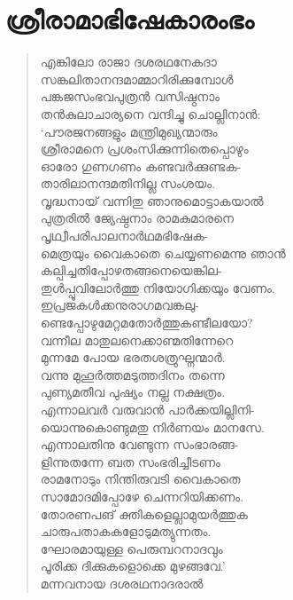 
\section{ശ്രീരാമാഭിഷേകാരംഭം}

\begin{verse}
എങ്കിലോ രാജാ ദശരഥനേകദാ\\
സങ്കലിതാനന്ദമാമ്മാറിരിക്കുമ്പോള്‍\\
പങ്കജസംഭവപുത്രന്‍ വസിഷ്ഠനാം\\
തന്‍കുലാചാര്യനെ വന്ദിച്ചു ചൊല്ലിനാന്‍:\\
‘പൗരജനങ്ങളും മന്ത്രിമുഖ്യന്മാരും\\
ശ്രീരാമനെ പ്രശംസിക്കുന്നിതെപ്പൊഴും\\
ഓരോ ഗുണഗണം കണ്ടവര്‍ക്കുണ്ടക-\\
താരിലാനന്ദമതിനില്ല സംശയം.\\
വൃദ്ധനായ് വന്നിതു ഞാനുമൊട്ടാകയാല്‍\\
പുത്രരില്‍ ജ്യേഷ്ഠനാം രാമകുമാരനെ\\
പൃഥ്വീപരിപാലനാര്‍ഥമഭിഷേക-\\
മെത്രയും വൈകാതെ ചെയ്യണമെന്നു ഞാന്‍\\
കല്പിച്ചതിപ്പോഴതങ്ങനെയെങ്കില-\\
തുള്‍പ്പൂവിലോര്‍ത്തു നിയോഗിക്കയും വേണം.\\
ഇപ്രജകള്‍ക്കനുരാഗമവങ്കലു-\\
ണ്ടെപ്പോഴുമേറ്റമതോര്‍ത്തുകണ്ടീലയോ?\\
വന്നീല മാതുലനെക്കാണ്മതിന്നേറെ\\
മുന്നമേ പോയ ഭരതശത്രുഘ്നന്മാര്‍.\\
വന്നു മുഹൂര്‍ത്തമടുത്തദിനം തന്നെ\\
പുണ്യമതീവ പുഷ്യം നല്ല നക്ഷത്രം.\\
എന്നാലവര്‍ വരുവാന്‍ പാര്‍ക്കയില്ലിനി-\\
യൊന്നുകൊണ്ടുമതു നിര്‍ണയം മാനസേ.\\
എന്നാലതിനു വേണ്ടുന്ന സംഭാരങ്ങ-\\
ളിന്നുതന്നേ ബത സംഭരിച്ചീടണം\\
രാമനോടും നിന്തിരുവടി വൈകാതെ\\
സാമോദമിപ്പോഴേ ചെന്നറിയിക്കണം.\\
തോരണപങ് ക്തികളെല്ലാമുയര്‍ത്തുക\\
ചാരുപതാകകളോടുമത്യുന്നതം.\\
ഘോരമായുള്ള പെരുമ്പറനാദവും\\
പൂരിക്ക ദിക്കുകളൊക്കെ മുഴങ്ങവേ.’\\
മന്നവനായ ദശരഥനാദരാല്‍\\

\end{verse}
